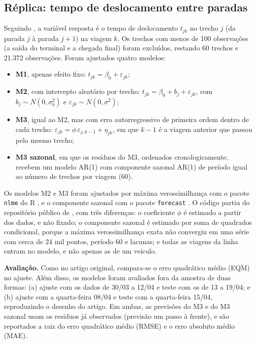 \subsection{Réplica: tempo de deslocamento entre paradas}

Seguindo \cite{courb}, a variável resposta é o tempo de deslocamento
$t_{jk}$ no trecho $j$ (da parada $j$ à parada $j+1$) na viagem $k$. Os trechos com menos de
100 observações (a saída do terminal e a chegada final) foram excluídos, restando 60 trechos e
21.372 observações. Foram ajustados quatro modelos:

\begin{itemize}
  \item \textbf{M1}, apenas efeito fixo: $t_{jk} = \beta_0 + \varepsilon_{jk}$;
  \item \textbf{M2}, com intercepto aleatório por trecho:
        $t_{jk} = \beta_0 + b_{j} + \varepsilon_{jk}$, com $b_j \sim N(0, \sigma_b^2)$ e
        $\varepsilon_{jk} \sim N(0, \sigma^2)$;
  \item \textbf{M3}, igual ao M2, mas com erro autorregressivo de primeira ordem dentro de cada
        trecho: $\varepsilon_{jk} = \phi\,\varepsilon_{j,k-1} + \eta_{jk}$, em que $k-1$ é a
        viagem anterior que passou pelo mesmo trecho;
  \item \textbf{M3 sazonal}, em que os resíduos do M3, ordenados cronologicamente, recebem um
        modelo AR(1) com componente sazonal AR(1) de período igual ao número de trechos por
        viagem (60).
\end{itemize}

Os modelos M2 e M3 foram ajustados por máxima verossimilhança com o pacote \texttt{nlme} do R
\cite{pinheiro2000}, e o componente sazonal com o pacote \texttt{forecast}
\cite{hyndman2008}. O código partiu do repositório público de \cite{courb}, com três diferenças: o coeficiente $\phi$ é estimado a partir dos dados, e
não fixado; o componente sazonal é estimado por soma de quadrados condicional, porque a
máxima verossimilhança exata não convergiu em uma série com cerca de 24 mil pontos, período 60
e lacunas; e todas as viagens da linha entram no modelo, e não apenas as de um veículo.

\textbf{Avaliação.} Como no artigo original, compara-se o erro quadrático médio (EQM) no
ajuste. Além disso, os modelos foram avaliados fora da amostra de duas formas: (a) ajuste com
os dados de 30/03 a 12/04 e teste com os de 13 a 19/04; e (b) ajuste com a quarta-feira 08/04
e teste com a quarta-feira 15/04, reproduzindo o desenho do artigo. Em ambas, as previsões do
M3 e do M3 sazonal usam os resíduos já observados (previsão um passo à frente), e são
reportados a raiz do erro quadrático médio (RMSE) e o erro absoluto médio (MAE).

